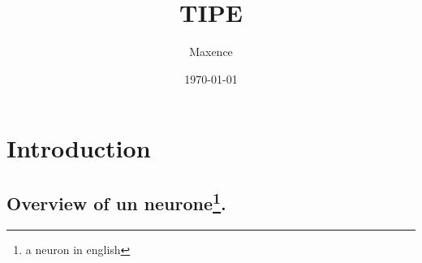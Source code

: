 \documentclass{beamer}
\title{TIPE}
\author{Maxence}
\date{\today}
\begin{document}
\frame{\titlepage}

\section[Outline]{}
\frame{\tableofcontents}

\section{Introduction}
\subsection{Overview of un neurone\footnote{a neuron in english}.}
\end{document}
